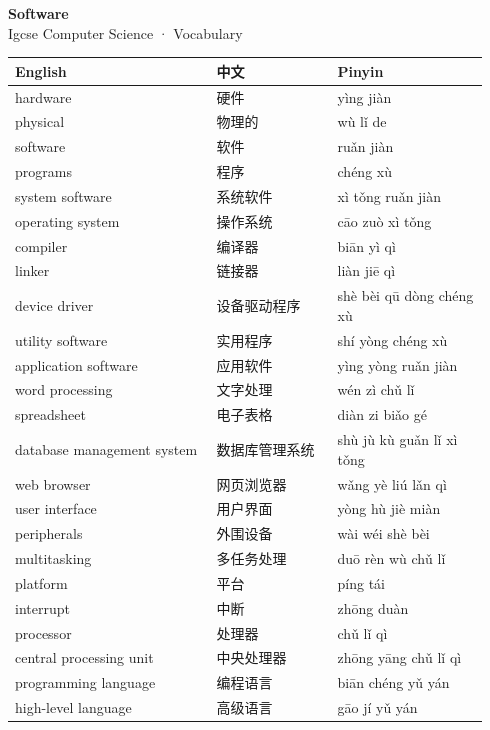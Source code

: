\documentclass[11pt]{article}
\begin{document}
\begin{center}
  {\LARGE\bfseries Software}\\[0.35em]
  {\large Igcse Computer Science · Vocabulary}
\end{center}
\vspace{0.6em}

\begin{longtable}{@{}p{0.40\linewidth}p{0.24\linewidth}p{0.30\linewidth}@{}}
\toprule
\textbf{English} & \textbf{中文} & \textbf{Pinyin} \\
\midrule
\endhead
\bottomrule
\endlastfoot
hardware & 硬件 & yìng jiàn \\
physical & 物理的 & wù lǐ de \\
software & 软件 & ruǎn jiàn \\
programs & 程序 & chéng xù \\
system software & 系统软件 & xì tǒng ruǎn jiàn \\
operating system & 操作系统 & cāo zuò xì tǒng \\
compiler & 编译器 & biān yì qì \\
linker & 链接器 & liàn jiē qì \\
device driver & 设备驱动程序 & shè bèi qū dòng chéng xù \\
utility software & 实用程序 & shí yòng chéng xù \\
application software & 应用软件 & yìng yòng ruǎn jiàn \\
word processing & 文字处理 & wén zì chǔ lǐ \\
spreadsheet & 电子表格 & diàn zi biǎo gé \\
database management system & 数据库管理系统 & shù jù kù guǎn lǐ xì tǒng \\
web browser & 网页浏览器 & wǎng yè liú lǎn qì \\
user interface & 用户界面 & yòng hù jiè miàn \\
peripherals & 外围设备 & wài wéi shè bèi \\
multitasking & 多任务处理 & duō rèn wù chǔ lǐ \\
platform & 平台 & píng tái \\
interrupt & 中断 & zhōng duàn \\
processor & 处理器 & chǔ lǐ qì \\
central processing unit & 中央处理器 & zhōng yāng chǔ lǐ qì \\
programming language & 编程语言 & biān chéng yǔ yán \\
high-level language & 高级语言 & gāo jí yǔ yán \\

\end{longtable}
\end{document}
